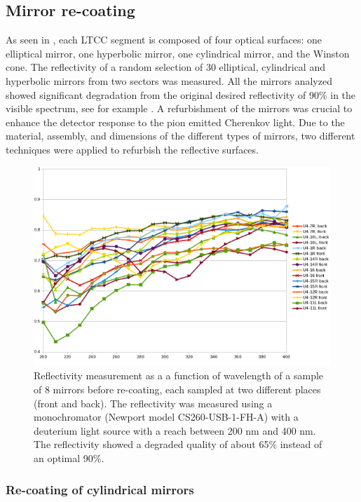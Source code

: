 \subsection{Mirror re-coating}

As seen in , each LTCC segment is composed of four optical surfaces: one elliptical mirror,
one hyperbolic mirror, one cylindrical mirror, and the Winston cone.
The reflectivity of a random selection of 30 elliptical, cylindrical and hyperbolic mirrors from two sectors was measured.
All the mirrors analyzed showed significant degradation from the original desired reflectivity of 90$\%$ in the visible spectrum,
see for example .
A refurbishment of the mirrors was crucial to enhance the detector response to the pion emitted Cherenkov light.
Due to the material, assembly, and dimensions of the different types of mirrors, two different techniques were applied to refurbish the
reflective surfaces.

\begin{figure}
\centering
	\includegraphics[width=1.0\columnwidth,keepaspectratio]{img/mirrorsReflectivityBefore.png}
	\caption{Reflectivity measurement as a a function of wavelength of a sample of 8 mirrors before re-coating, each sampled at two different places (front and back). The reflectivity
				was measured using a monochromator (Newport model CS260-USB-1-FH-A) with a deuterium light source with a reach
            between 200 nm and 400 nm. The reflectivity showed a degraded quality of about 65$\%$ instead of an optimal 90$\%$.}
	\label{fig:reflectivityBefore}
\end{figure}


\subsubsection{Re-coating of cylindrical mirrors}

